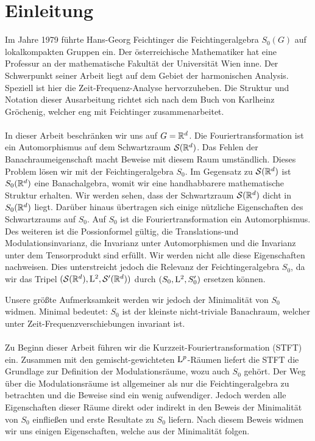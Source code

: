 \section{Einleitung}
Im Jahre 1979 führte Hans-Georg Feichtinger die Feichtingeralgebra $ S_0(G) $ auf lokalkompakten Gruppen ein\cite{Feichtinger1979}.
Der österreichische Mathematiker hat eine Professur an der mathematische Fakultät der 
Universität Wien inne. 
Der Schwerpunkt seiner Arbeit liegt auf dem Gebiet der harmonischen Analysis.
Speziell ist hier die Zeit-Frequenz-Analyse hervorzuheben.
Die Struktur und Notation dieser Ausarbeitung richtet sich nach dem Buch  von Karlheinz Gröchenig\cite{noauthor2009Foundationsof}, welcher eng mit Feichtinger zusammenarbeitet.
\ \\
\\
In dieser Arbeit beschränken wir uns auf $ G = \mathbb{R}^d $.
Die Fouriertransformation ist ein Automorphismus auf dem Schwartzraum $ \mathcal{S}(\mathbb{R}^d) $.
Das Fehlen der Banachraumeigenschaft macht Beweise mit diesem Raum umständlich.
Dieses Problem lösen wir mit der Feichtingeralgebra $ S_0 $.
Im Gegensatz zu  $ \mathcal{S}(\mathbb{R}^d) $ ist $ S_0(\mathbb{R}^d) $ eine Banachalgebra, womit wir eine handhabbarere mathematische Struktur erhalten.
Wir werden sehen, dass der Schwartzraum $ \mathcal{S}(\mathbb{R}^d) $ dicht in $ S_0(\mathbb{R}^d) $ liegt.
Darüber hinaus übertragen sich einige nützliche Eigenschaften des Schwartzraums auf $ S_0 $.
Auf $ S_0 $ ist die Fouriertransformation ein Automorphismus.
Des weiteren ist die Possionformel gültig, die Translations-und Modulationsinvarianz, die Invarianz unter Automorphismen und die Invarianz unter dem Tensorprodukt sind erfüllt. Wir werden nicht alle diese Eigenschaften nachweisen.
Dies unterstreicht jedoch die Relevanz der Feichtingeralgebra $ S_0 $, da wir das Tripel $ (\mathcal{S}(\mathbb{R}^d), \mathrm{L}^2 , \mathcal{S}^\prime(\mathbb{R}^d) )$
durch $ (S_0, \mathrm{L}^2 , S_0^\prime) $ ersetzen können.
 
Unsere größte Aufmerksamkeit werden wir jedoch der Minimalität von $ S_0 $ widmen.
Minimal bedeutet:
$ S_0 $ ist der kleinste nicht-triviale Banachraum, welcher unter Zeit-Frequenzverschiebungen invariant ist.
\ \\
\\
Zu Beginn dieser Arbeit führen wir die Kurzzeit-Fouriertransformation (STFT) ein.
Zusammen mit den gemischt-gewichteten $ \mathrm{L}^p $-Räumen liefert die STFT die Grundlage zur Definition der Modulationsräume, wozu auch $ S_0 $ gehört.
Der Weg über die Modulationsräume ist allgemeiner als nur die Feichtingeralgebra zu betrachten und die Beweise sind ein wenig aufwendiger.
Jedoch werden alle Eigenschaften dieser Räume direkt oder indirekt in den Beweis der Minimalität von $ S_0 $ einfließen
und erste Resultate zu $ S_0 $ liefern.
Nach diesem Beweis widmen wir uns einigen Eigenschaften, welche aus der Minimalität folgen.
\\





